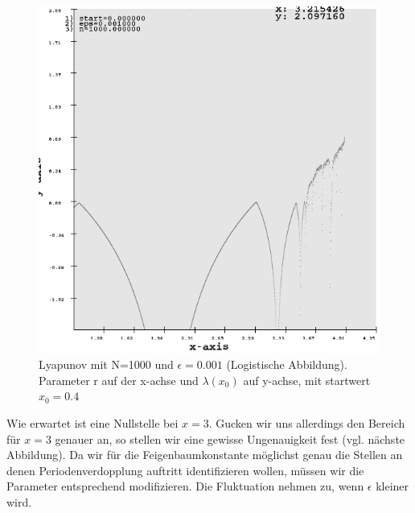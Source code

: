 \documentclass{scrartcl}
\begin{document}
\begin{figure}
	\centering
	\includegraphics[scale=0.65]{lyapunov_1000}
	\caption{Lyapunov mit N=1000 und $\epsilon=0.001$ (Logistische Abbildung). Parameter r auf der x-achse und $\lambda(x_0)$ auf y-achse, mit startwert $x_0=0.4$}
	\label{img:lyapunov_100}
\end{figure}
Wie erwartet ist eine Nullstelle bei $x=3$. Gucken wir uns allerdings den Bereich für $x=3$ genauer an, so stellen wir eine gewisse Ungenauigkeit fest (vgl. nächste Abbildung). Da wir für die Feigenbaumkonstante möglichst genau die Stellen an denen Periodenverdopplung auftritt identifizieren wollen, müssen wir die Parameter entsprechend modifizieren. Die Fluktuation nehmen zu, wenn $\epsilon$ kleiner wird.
\end{document}
